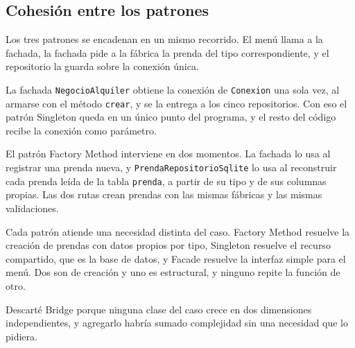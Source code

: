 \subsection{Cohesión entre los patrones}

Los tres patrones se encadenan en un mismo recorrido. El menú llama a la fachada, la fachada pide a la fábrica la prenda del tipo correspondiente, y el repositorio la guarda sobre la conexión única.

La fachada \texttt{NegocioAlquiler} obtiene la conexión de \texttt{Conexion} una sola vez, al armarse con el método \texttt{crear}, y se la entrega a los cinco repositorios. Con eso el patrón Singleton queda en un único punto del programa, y el resto del código recibe la conexión como parámetro.

El patrón Factory Method interviene en dos momentos. La fachada lo usa al registrar una prenda nueva, y \texttt{PrendaRepositorioSqlite} lo usa al reconstruir cada prenda leída de la tabla \texttt{prenda}, a partir de su tipo y de sus columnas propias. Las dos rutas crean prendas con las mismas fábricas y las mismas validaciones.

Cada patrón atiende una necesidad distinta del caso. Factory Method resuelve la creación de prendas con datos propios por tipo, Singleton resuelve el recurso compartido, que es la base de datos, y Facade resuelve la interfaz simple para el menú. Dos son de creación y uno es estructural, y ninguno repite la función de otro.

Descarté Bridge porque ninguna clase del caso crece en dos dimensiones independientes, y agregarlo habría sumado complejidad sin una necesidad que lo pidiera.
